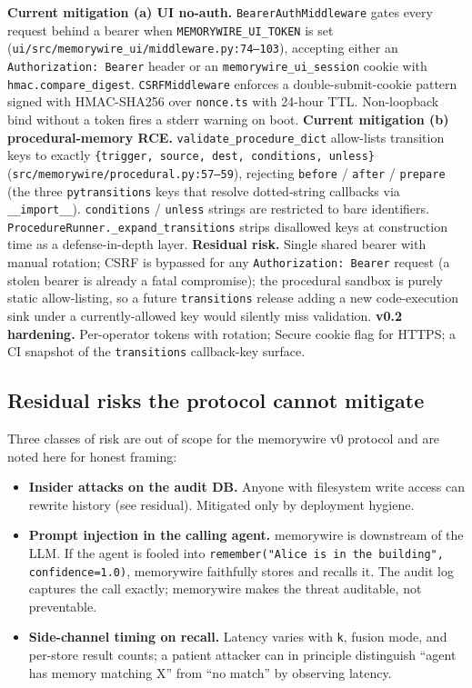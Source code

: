 \documentclass[11pt,letterpaper,twocolumn]{article}
\begin{document}
\textbf{Current mitigation (a) UI no-auth.} \texttt{BearerAuthMiddleware} gates every request behind a bearer when \texttt{MEMORYWIRE\_UI\_TOKEN} is set (\texttt{ui/src/memorywire\_ui/middleware.py:74--103}), accepting either an \texttt{Authorization: Bearer} header or an \texttt{memorywire\_ui\_session} cookie with \texttt{hmac.compare\_digest}. \texttt{CSRFMiddleware} enforces a double-submit-cookie pattern signed with HMAC-SHA256 over \texttt{nonce.ts} with 24-hour TTL. Non-loopback bind without a token fires a stderr warning on boot. \textbf{Current mitigation (b) procedural-memory RCE.} \texttt{validate\_procedure\_dict} allow-lists transition keys to exactly \texttt{\{trigger, source, dest, conditions, unless\}} (\texttt{src/memorywire/procedural.py:57--59}), rejecting \texttt{before} / \texttt{after} / \texttt{prepare} (the three \texttt{pytransitions} keys that resolve dotted-string callbacks via \texttt{\_\_import\_\_}). \texttt{conditions} / \texttt{unless} strings are restricted to bare identifiers. \texttt{ProcedureRunner.\_expand\_transitions} strips disallowed keys at construction time as a defense-in-depth layer. \textbf{Residual risk.} Single shared bearer with manual rotation; CSRF is bypassed for any \texttt{Authorization: Bearer} request (a stolen bearer is already a fatal compromise); the procedural sandbox is purely static allow-listing, so a future \texttt{transitions} release adding a new code-execution sink under a currently-allowed key would silently miss validation. \textbf{v0.2 hardening.} Per-operator tokens with rotation; Secure cookie flag for HTTPS; a CI snapshot of the \texttt{transitions} callback-key surface.

\subsection{Residual risks the protocol cannot mitigate}
\label{sec:threats-residual}

Three classes of risk are out of scope for the memorywire v0 protocol and are noted here for honest framing:

\begin{itemize}[leftmargin=*]
  \item \textbf{Insider attacks on the audit DB.} Anyone with filesystem write access can rewrite history (see  residual). Mitigated only by deployment hygiene.
  \item \textbf{Prompt injection in the calling agent.} memorywire is downstream of the LLM. If the agent is fooled into \texttt{remember("Alice is in the building", confidence=1.0)}, memorywire faithfully stores and recalls it. The audit log captures the call exactly; memorywire makes the threat auditable, not preventable.
  \item \textbf{Side-channel timing on recall.} Latency varies with \texttt{k}, fusion mode, and per-store result counts; a patient attacker can in principle distinguish ``agent has memory matching X'' from ``no match'' by observing latency.
\end{itemize}
\end{document}
